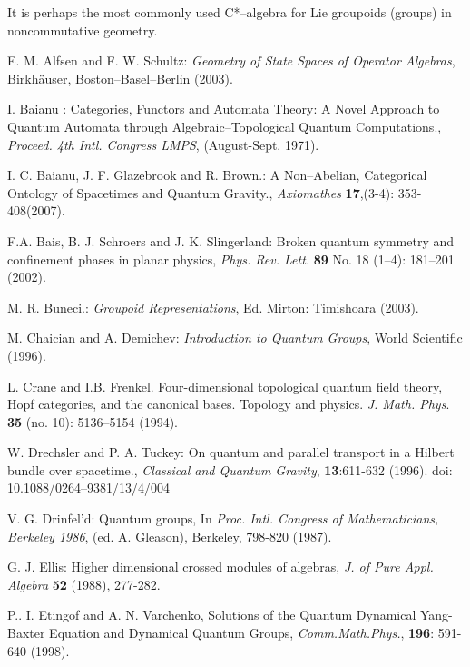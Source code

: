 \documentclass[12pt]{article}
\theoremstyle{plain}
\theoremstyle{definition}
\numberwithin{equation}{section}
\begin{document}
It is perhaps the most commonly used C*--algebra for Lie groupoids
(groups) in noncommutative geometry.



\begin{thebibliography}{99}

E. M. Alfsen and F. W. Schultz: \emph{Geometry of State Spaces of Operator Algebras}, Birkh\"auser, Boston--Basel--Berlin (2003).

I. Baianu : Categories, Functors and Automata Theory: A Novel Approach to Quantum Automata through Algebraic--Topological Quantum Computations., \textit{Proceed. 4th Intl. Congress LMPS}, (August-Sept. 1971).

I. C. Baianu, J. F. Glazebrook and R. Brown.: A Non--Abelian, Categorical Ontology of Spacetimes and Quantum Gravity., \emph{Axiomathes} \textbf{17},(3-4): 353-408(2007).

F.A. Bais, B. J. Schroers and J. K. Slingerland: Broken quantum symmetry and confinement phases in planar physics, \emph{Phys. Rev. Lett.} \textbf{89} No. 18 (1--4): 181--201 (2002).

M. R. Buneci.: \emph{Groupoid Representations}, Ed. Mirton: Timishoara (2003). 

M. Chaician and A. Demichev: \emph{Introduction to Quantum Groups}, World Scientific (1996).

L. Crane and I.B. Frenkel. Four-dimensional topological quantum field theory, Hopf categories, and the canonical bases. Topology and physics. \textit{J. Math. Phys}. \textbf{35} (no. 10): 5136--5154 (1994).

W. Drechsler and P. A. Tuckey:  On quantum and parallel transport in a Hilbert bundle over spacetime., \emph{Classical and Quantum Gravity}, \textbf{13}:611-632 (1996). doi: 10.1088/0264--9381/13/4/004

V. G. Drinfel'd: Quantum groups, In \emph{Proc. Intl. Congress of Mathematicians, Berkeley 1986}, (ed. A. Gleason), Berkeley, 798-820 (1987).

G. J. Ellis: Higher dimensional crossed modules of algebras,
\emph{J. of Pure Appl. Algebra} \textbf{52} (1988), 277-282.

P.. I. Etingof and A. N. Varchenko, Solutions of the Quantum Dynamical Yang-Baxter Equation and Dynamical Quantum Groups, \emph{Comm.Math.Phys.}, \textbf{196}: 591-640 (1998).


\end{thebibliography}
\end{document}
